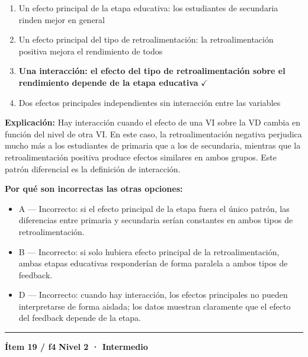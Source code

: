 \documentclass[12pt,a4paper]{article}
\begin{document}
\begin{enumerate}
  \item[A.] Un efecto principal de la etapa educativa: los estudiantes de secundaria rinden mejor en general
  \item[B.] Un efecto principal del tipo de retroalimentación: la retroalimentación positiva mejora el rendimiento de todos
  \item[\textbf{\color{verde}C.}] \textbf{\color{verde} Una interacción: el efecto del tipo de retroalimentación sobre el rendimiento depende de la etapa educativa} \hfill $\checkmark$
  \item[D.] Dos efectos principales independientes sin interacción entre las variables
\end{enumerate}

\noindent\textbf{\color{azul}Explicación:} Hay interacción cuando el efecto de una VI sobre la VD cambia en función del nivel de otra VI. En este caso, la retroalimentación negativa perjudica mucho más a los estudiantes de primaria que a los de secundaria, mientras que la retroalimentación positiva produce efectos similares en ambos grupos. Este patrón diferencial es la definición de interacción.

\noindent\textbf{\color{gris}Por qué son incorrectas las otras opciones:}
\begin{itemize}
  \item {\small A — Incorrecto: si el efecto principal de la etapa fuera el único patrón, las diferencias entre primaria y secundaria serían constantes en ambos tipos de retroalimentación.}
  \item {\small B — Incorrecto: si solo hubiera efecto principal de la retroalimentación, ambas etapas educativas responderían de forma paralela a ambos tipos de feedback.}
  \item {\small D — Incorrecto: cuando hay interacción, los efectos principales no pueden interpretarse de forma aislada; los datos muestran claramente que el efecto del feedback depende de la etapa.}
\end{itemize}
\vspace{8pt}\hrule\vspace{10pt}

\begin{mdframed}[backgroundcolor=fondogris,linecolor=ambar,linewidth=1pt,innerleftmargin=10pt,innerrightmargin=10pt,innertopmargin=7pt,innerbottommargin=7pt]
\textbf{Ítem 19 / f4} \hfill {\small\bfseries\color{ambar} Nivel 2 · Intermedio}
\end{mdframed}
\end{document}
